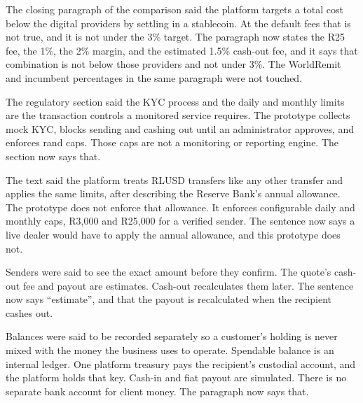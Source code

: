 \documentclass[11pt,a4paper]{article}
\begin{document}
\begin{description}[leftmargin=0pt,style=nextline,font=\normalfont\bfseries]

\item[Cheaper than the digital providers.]
The closing paragraph of the comparison said the platform targets a total cost below the digital providers by settling in a stablecoin.
At the default fees that is not true, and it is not under the 3\% target.
The paragraph now states the R25 fee, the 1\%, the 2\% margin, and the estimated 1.5\% cash-out fee, and it says that combination is not below those providers and not under 3\%.
The WorldRemit and incumbent percentages in the same paragraph were not touched.

\item[Anti-money-laundering controls.]
The regulatory section said the KYC process and the daily and monthly limits are the transaction controls a monitored service requires.
The prototype collects mock KYC, blocks sending and cashing out until an administrator approves, and enforces rand caps.
Those caps are not a monitoring or reporting engine.
The section now says that.

\item[The R2 million allowance.]
The text said the platform treats RLUSD transfers like any other transfer and applies the same limits, after describing the Reserve Bank's annual allowance.
The prototype does not enforce that allowance.
It enforces configurable daily and monthly caps, R3{,}000 and R25{,}000 for a verified sender.
The sentence now says a live dealer would have to apply the annual allowance, and this prototype does not.

\item[The exact amount the recipient will receive.]
Senders were said to see the exact amount before they confirm.
The quote's cash-out fee and payout are estimates.
Cash-out recalculates them later.
The sentence now says ``estimate'', and that the payout is recalculated when the recipient cashes out.

\item[Client money kept apart from the business.]
Balances were said to be recorded separately so a customer's holding is never mixed with the money the business uses to operate.
Spendable balance is an internal ledger.
One platform treasury pays the recipient's custodial account, and the platform holds that key.
Cash-in and fiat payout are simulated.
There is no separate bank account for client money.
The paragraph now says that.


\end{description}
\end{document}
